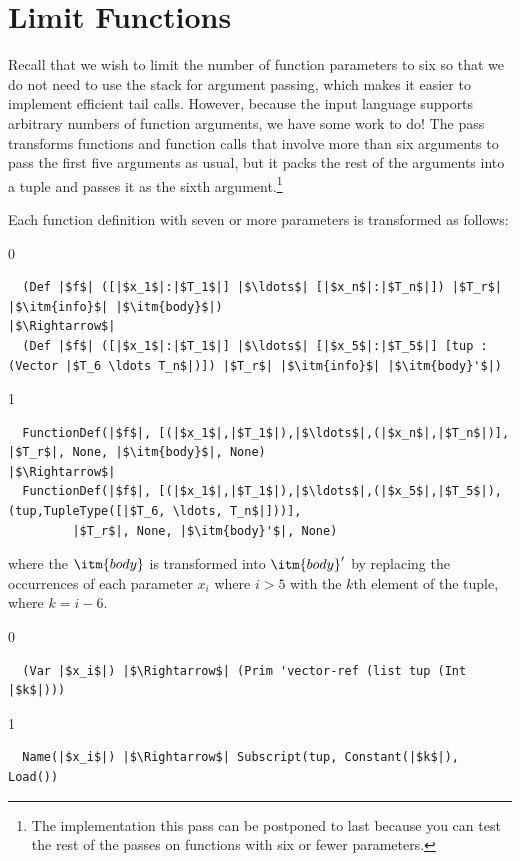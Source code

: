 \documentclass[7x10]{TimesAPriori_MIT}%
\def\racketEd{0}
\def\pythonEd{1}
\providecommand{\BookEdition}{1}
\let\edition\BookEdition
\newcommand{\pythonColor}[0]{}
\numberwithin{theorem}{chapter}
\numberwithin{definition}{chapter}
\numberwithin{equation}{chapter}
\begin{document}
\section{Limit Functions}
\label{sec:limit-functions-r4}

Recall that we wish to limit the number of function parameters to six
so that we do not need to use the stack for argument passing, which
makes it easier to implement efficient tail calls.  However, because
the input language \LangFun{} supports arbitrary numbers of function
arguments, we have some work to do! The  pass
transforms functions and function calls that involve more than six
arguments to pass the first five arguments as usual, but it packs the
rest of the arguments into a tuple and passes it as the sixth
argument.\footnote{The implementation this pass can be postponed to
  last because you can test the rest of the passes on functions with
  six or fewer parameters.}

Each function definition with seven or more parameters is transformed as
follows:
{\if\edition\racketEd   
\begin{lstlisting}
  (Def |$f$| ([|$x_1$|:|$T_1$|] |$\ldots$| [|$x_n$|:|$T_n$|]) |$T_r$| |$\itm{info}$| |$\itm{body}$|) 
|$\Rightarrow$|
  (Def |$f$| ([|$x_1$|:|$T_1$|] |$\ldots$| [|$x_5$|:|$T_5$|] [tup : (Vector |$T_6 \ldots T_n$|)]) |$T_r$| |$\itm{info}$| |$\itm{body}'$|) 
\end{lstlisting}
\fi}
{\if\edition\pythonEd\pythonColor   
\begin{lstlisting}
  FunctionDef(|$f$|, [(|$x_1$|,|$T_1$|),|$\ldots$|,(|$x_n$|,|$T_n$|)], |$T_r$|, None, |$\itm{body}$|, None)
|$\Rightarrow$|
  FunctionDef(|$f$|, [(|$x_1$|,|$T_1$|),|$\ldots$|,(|$x_5$|,|$T_5$|),(tup,TupleType([|$T_6, \ldots, T_n$|]))],
         |$T_r$|, None, |$\itm{body}'$|, None)
\end{lstlisting}
\fi}
%
\noindent where the $\itm{body}$ is transformed into $\itm{body}'$ by
replacing the occurrences of each parameter $x_i$ where $i > 5$ with
the $k$th element of the tuple, where $k = i - 6$.
%
{\if\edition\racketEd
\begin{lstlisting}
  (Var |$x_i$|) |$\Rightarrow$| (Prim 'vector-ref (list tup (Int |$k$|)))
\end{lstlisting}
\fi}
{\if\edition\pythonEd\pythonColor   
\begin{lstlisting}
  Name(|$x_i$|) |$\Rightarrow$| Subscript(tup, Constant(|$k$|), Load())
\end{lstlisting}
\fi}
\end{document}
